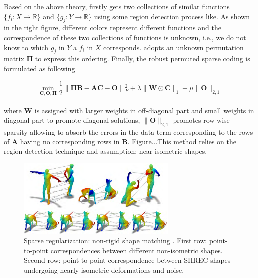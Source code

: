 Based on the above theory, \cite{pokrass2013sparse} firstly gets two collections of similar functions $\{f_{i}:X\to \mathbb{R}\}$ and $\{g_{j}:Y\to \mathbb{R}\}$ using some region detection process like\cite{litman2011diffusion}. As shown in the right figure, different colors represent different functions and the correspondence of these two collections of functions is unknown, i.e., we do not know to which $g_{j}$ in $Y$ a $f_{i}$ in $X$ corresponds.
\cite{pokrass2013sparse} adopts an unknown permutation matrix $\mathbf{\Pi}$ to express this ordering. Finally, the robust permuted sparse coding is formulated as following

\small{
\begin{equation}
 \label{eq:permutedsparse}
 \min_{\mathbf{C},\mathbf{O},\mathbf{\Pi}}\frac{1}{2}\|\mathbf{\Pi}\mathbf{B}-\mathbf{AC}-\mathbf{O}\|{_{F}^2}+\lambda\|\mathbf{W}\odot\mathbf{C}\|_1+\mu\|\mathbf{O}\|_{2,1}
\end{equation}
}
\\
where $\mathbf{W}$ is assigned with larger weights in off-diagonal part and small weights in diagonal part to promote diagonal solutions, $\|\mathbf{O}\|_{2,1}$ promotes row-wise sparsity allowing to absorb the errors in the data term corresponding to the rows of $\mathbf{A}$ having no corresponding rows in $\mathbf{B}$.
Figure...This method relies on the region detection technique and assumption: near-isometric shapes.

\begin{figure}[ht]
  \centering
  \includegraphics[width=3in]{images/matching_L1}
  \caption{Sparse regularization: non-rigid shape matching \cite{wang2014decoupling}. First row: point-to-point correspondences between different non-isometric shapes. Second row: point-to-point correspondence between SHREC shapes undergoing nearly isometric deformations and noise.}
\end{figure}


